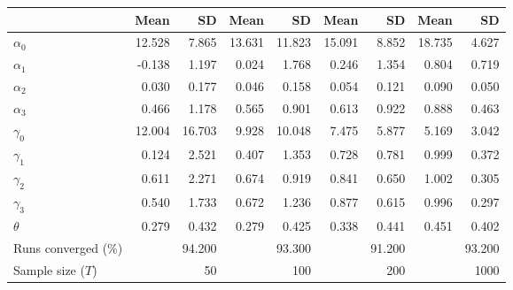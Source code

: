 
\begin{tabular}[t]{lrrrrrrrr}
\toprule
  & Mean & SD & Mean  & SD  & Mean   & SD   & Mean    & SD   \\
\midrule
$\alpha_{0}$ & 12.528 & 7.865 & 13.631 & 11.823 & 15.091 & 8.852 & 18.735 & 4.627\\
$\alpha_{1}$ & -0.138 & 1.197 & 0.024 & 1.768 & 0.246 & 1.354 & 0.804 & 0.719\\
$\alpha_{2}$ & 0.030 & 0.177 & 0.046 & 0.158 & 0.054 & 0.121 & 0.090 & 0.050\\
$\alpha_{3}$ & 0.466 & 1.178 & 0.565 & 0.901 & 0.613 & 0.922 & 0.888 & 0.463\\
$\gamma_{0}$ & 12.004 & 16.703 & 9.928 & 10.048 & 7.475 & 5.877 & 5.169 & 3.042\\
$\gamma_{1}$ & 0.124 & 2.521 & 0.407 & 1.353 & 0.728 & 0.781 & 0.999 & 0.372\\
$\gamma_{2}$ & 0.611 & 2.271 & 0.674 & 0.919 & 0.841 & 0.650 & 1.002 & 0.305\\
$\gamma_{3}$ & 0.540 & 1.733 & 0.672 & 1.236 & 0.877 & 0.615 & 0.996 & 0.297\\
$\theta$ & 0.279 & 0.432 & 0.279 & 0.425 & 0.338 & 0.441 & 0.451 & 0.402\\
Runs converged (\%) &  & 94.200 &  & 93.300 &  & 91.200 &  & 93.200\\
Sample size ($T$) &  & 50 &  & 100 &  & 200 &  & 1000\\
\bottomrule
\end{tabular}
